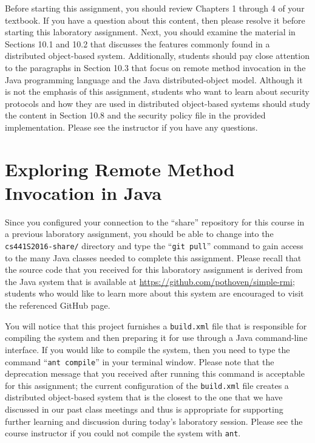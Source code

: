 Before starting this assignment, you should review Chapters 1 through 4 of your textbook. If you have a question about
this content, then please resolve it before starting this laboratory assignment. Next, you should examine the material
in Sections 10.1 and 10.2 that discusses the features commonly found in a distributed object-based system. Additionally,
students should pay close attention to the paragraphs in Section 10.3 that focus on remote method invocation in the Java
programming language and the Java distributed-object model. Although it is not the emphasis of this assignment, students
who want to learn about security protocols and how they are used in distributed object-based systems should study the
content in Section 10.8 and the security policy file in the provided implementation.  Please see the instructor if you
have any questions.

\section*{Exploring Remote Method Invocation in Java}

Since you configured your connection to the ``share'' repository for this course in a previous laboratory assignment,
you should be able to change into the {\tt cs441S2016-share/} directory and type the ``{\tt git pull}'' command to gain
access to the many Java classes needed to complete this assignment. Please recall that the source code that you received
for this laboratory assignment is derived from the Java system that is available at
\url{https://github.com/pothoven/simple-rmi}; students who would like to learn more about this system are encouraged to
visit the referenced GitHub page.

You will notice that this project furnishes a {\tt build.xml} file that is responsible for compiling the system and then
preparing it for use through a Java command-line interface. If you would like to compile the system, then you need to
type the command ``{\tt ant compile}'' in your terminal window. Please note that the deprecation message that you
received after running this command is acceptable for this assignment; the current configuration of the {\tt build.xml}
file creates a distributed object-based system that is the closest to the one that we have discussed in our past class
meetings and thus is appropriate for supporting further learning and discussion during today's laboratory session.
Please see the course instructor if you could not compile the system with {\tt ant}.

